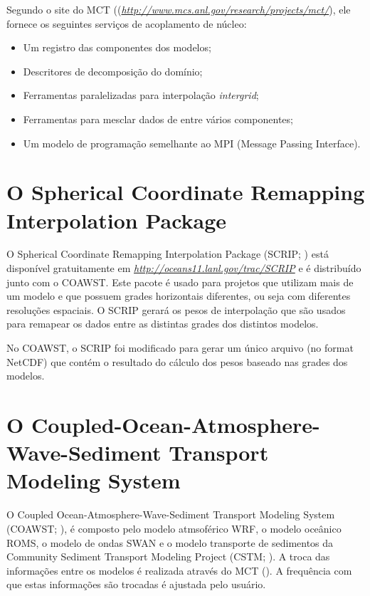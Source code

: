 \noindent Segundo o site do MCT ((\textcolor{bleu_cite}{\href{http://www.mcs.anl.gov/research/projects/mct/}{\textit{http://www.mcs.anl.gov/research/projects/mct/}}}), ele fornece os seguintes serviços de acoplamento de núcleo:
\bigskip

\begin{itemize}
\item Um registro das componentes dos modelos;
\item Descritores de decomposição do domínio;
\item Ferramentas paralelizadas para interpolação \textit{intergrid};
\item Ferramentas para mesclar dados de entre vários componentes;
\item Um modelo de programação semelhante ao MPI (Message Passing Interface).
\end{itemize}
\bigskip

\section{ O Spherical Coordinate Remapping Interpolation Package}\label{scripsecao}
\bigskip

\noindent O  Spherical Coordinate Remapping Interpolation Package (SCRIP; \cite{Jones1999,Jones1998}) está disponível gratuitamente em \textcolor{bleu_cite}{\href{http://oceans11.lanl.gov/trac/SCRIP}{\textit{http://oceans11.lanl.gov/trac/SCRIP}}} e é distribuído junto com o COAWST. Este pacote é usado para projetos que utilizam mais de um modelo e que possuem grades horizontais diferentes, ou seja com diferentes resoluções espaciais. O SCRIP gerará os pesos de interpolação que são usados para remapear os dados entre as distintas grades dos distintos modelos.
\bigskip

\noindent No COAWST, o SCRIP foi modificado para gerar um único arquivo (no format NetCDF) que contém o resultado do cálculo dos pesos baseado nas grades dos modelos.

\bigskip

\section{O Coupled-Ocean-Atmosphere-Wave-Sediment Transport Modeling System}
\bigskip
\noindent O Coupled Ocean-Atmosphere-Wave-Sediment Transport Modeling System (COAWST; \cite{Warner2010,Warner2008}), é composto pelo modelo atmsoférico WRF, o modelo oceânico ROMS, o modelo de ondas SWAN e o modelo transporte de sedimentos da Community Sediment Transport Modeling Project (CSTM; \cite{Warner2008}). A troca das informações entre os modelos é realizada através do MCT (\cite{Warner2010,Warner2008}). A frequência com que estas informações são trocadas é ajustada pelo usuário.
\bigskip

